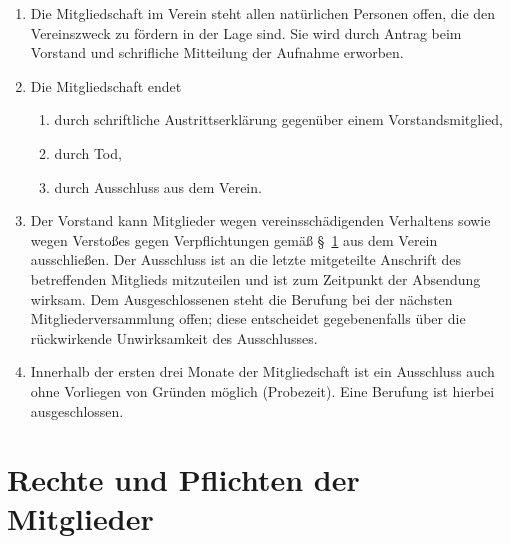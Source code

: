 \documentclass[a4paper, 10pt, headings=normal]{scrartcl}
\begin{document}
\begin{multicols}{2}
\begin{enumerate}[label={(\arabic*)}]
	\item
		Die Mitgliedschaft im Verein steht allen natürlichen Personen offen, die den Vereinszweck zu fördern in der Lage sind.
		Sie wird durch Antrag beim Vorstand und schrifliche Mitteilung der Aufnahme erworben.
	\item
		Die Mitgliedschaft endet
		\begin{enumerate}[label={\arabic*.}]
			\item
				durch schriftliche Austrittserklärung gegenüber einem Vorstandsmitglied,
			\item
				durch Tod,
			\item
				durch Ausschluss aus dem Verein.
		\end{enumerate}
	\item
		Der Vorstand kann Mitglieder wegen vereinsschädigenden Verhaltens sowie wegen Verstoßes gegen Verpflichtungen gemäß §~\ref{par:rechte-pflichten-mitglieder} aus dem Verein ausschließen.
		Der Ausschluss ist an die letzte mitgeteilte Anschrift des betreffenden Mitglieds mitzuteilen und ist zum Zeitpunkt der Absendung wirksam.
		Dem Ausgeschlossenen steht die Berufung bei der nächsten Mitgliederversammlung offen; diese entscheidet gegebenenfalls über die rückwirkende Unwirksamkeit des Ausschlusses.
	\item
		Innerhalb der ersten drei Monate der Mitgliedschaft ist ein Ausschluss auch ohne Vorliegen von Gründen möglich (Probezeit). Eine Berufung ist hierbei ausgeschlossen.
\end{enumerate}

\section{Rechte und Pflichten der Mitglieder}
\label{par:rechte-pflichten-mitglieder}


\end{multicols}
\end{document}
